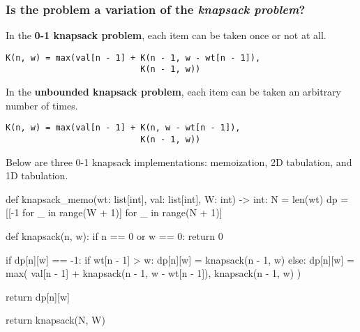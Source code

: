 \documentclass[12pt, titlepage]{article}
\begin{document}
\subsubsection{Is the problem a variation of the \textit{knapsack problem}?}

\begin{center}
 \medskip
\end{center}

In the \textbf{0-1 knapsack problem}, each item can be taken once or not at all. \medskip
\begin{center}
\begin{varwidth}{\linewidth}
\begin{verbatim}
K(n, w) = max(val[n - 1] + K(n - 1, w - wt[n - 1]),
                           K(n - 1, w))
\end{verbatim}
\end{varwidth}
\end{center}

In the \textbf{unbounded knapsack problem}, each item can be taken an arbitrary number of times. \medskip
\begin{center}
\begin{varwidth}{\linewidth}
\begin{verbatim}
K(n, w) = max(val[n - 1] + K(n, w - wt[n - 1]),
                           K(n - 1, w))
\end{verbatim}
\end{varwidth}
\end{center}

Below are three 0-1 knapsack implementations: memoization, 2D tabulation, and 1D tabulation. \medskip

\begin{python}
def knapsack_memo(wt: list[int], val: list[int], W: int) -> int:
    N = len(wt)
    dp = [[-1 for _ in range(W + 1)] for _ in range(N + 1)]

    def knapsack(n, w):
        if n == 0 or w == 0:
            return 0

        if dp[n][w] == -1:
            if wt[n - 1] > w:
                dp[n][w] = knapsack(n - 1, w)
            else:
                dp[n][w] = max(
                    val[n - 1] + knapsack(n - 1, w - wt[n - 1]),
                    knapsack(n - 1, w)
                )

        return dp[n][w]

    return knapsack(N, W)
\end{python}
\end{document}
